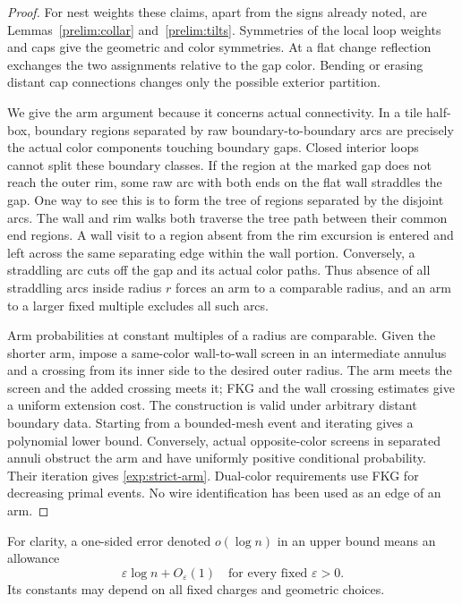 \begin{proof}
For nest weights these claims, apart from the signs already noted, are
Lemmas~\ref{prelim:collar} and~\ref{prelim:tilts}. Symmetries of the
local loop weights and caps give the geometric and color symmetries.
At a flat change reflection exchanges the two assignments relative to
the gap color. Bending or erasing distant cap connections changes only
the possible exterior partition.

We give the arm argument because it concerns actual connectivity. In a
tile half-box, boundary regions separated by raw boundary-to-boundary
arcs are precisely the actual color components touching boundary gaps.
Closed interior loops cannot split these boundary classes. If the region
at the marked gap does not reach the outer rim, some raw arc with both
ends on the flat wall straddles the gap. One way to see this is to form
the tree of regions separated by the disjoint arcs. The wall and rim
walks both traverse the tree path between their common end regions.
A wall visit to a region absent from the rim excursion is entered and
left across the same separating edge within the wall portion. Conversely,
a straddling arc cuts off the gap and its actual color paths. Thus absence
of all straddling arcs inside radius $r$ forces an arm to a comparable
radius, and an arm to a larger fixed multiple excludes all such arcs.

Arm probabilities at constant multiples of a radius are comparable.
Given the shorter arm, impose a same-color wall-to-wall screen in an
intermediate annulus and a crossing from its inner side to the desired
outer radius. The arm meets the screen and the added crossing meets it;
FKG and the wall crossing estimates give a uniform extension cost.
The construction is valid under arbitrary distant boundary data.
Starting from a bounded-mesh event and iterating gives a polynomial
lower bound. Conversely, actual opposite-color screens in separated
annuli obstruct the arm and have uniformly positive conditional
probability. Their iteration gives \eqref{exp:strict-arm}. Dual-color
requirements use FKG for decreasing primal events. No wire identification
has been used as an edge of an arm.
\end{proof}

For clarity, a one-sided error denoted $o(\log n)$ in an upper bound
means an allowance
\begin{equation}\label{exp:error-convention}
 \varepsilon\log n+O_\varepsilon(1)
 \quad\text{for every fixed }\varepsilon>0.
\end{equation}
Its constants may depend on all fixed charges and geometric choices.

